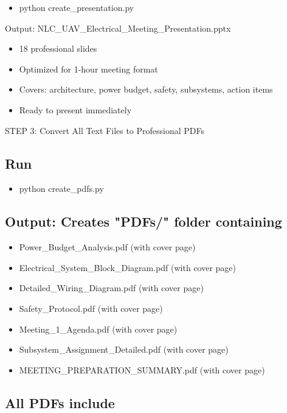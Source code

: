 \documentclass[11pt,letterpaper]{article}
\begin{document}
\begin{itemize}
  \item python create\_presentation.py
\end{itemize}

Output: NLC\_UAV\_Electrical\_Meeting\_Presentation.pptx\par

\begin{itemize}
  \item 18 professional slides
  \item Optimized for 1-hour meeting format
  \item Covers: architecture, power budget, safety, subsystems, action items
  \item Ready to present immediately
\end{itemize}

STEP 3: Convert All Text Files to Professional PDFs\par

\subsection{Run}

\begin{itemize}
  \item python create\_pdfs.py
\end{itemize}

\subsection{Output: Creates "PDFs/" folder containing}

\begin{itemize}
  \item Power\_Budget\_Analysis.pdf (with cover page)
  \item Electrical\_System\_Block\_Diagram.pdf (with cover page)
  \item Detailed\_Wiring\_Diagram.pdf (with cover page)
  \item Safety\_Protocol.pdf (with cover page)
  \item Meeting\_1\_Agenda.pdf (with cover page)
  \item Subsystem\_Assignment\_Detailed.pdf (with cover page)
  \item MEETING\_PREPARATION\_SUMMARY.pdf (with cover page)
\end{itemize}

\subsection{All PDFs include}
\end{document}

